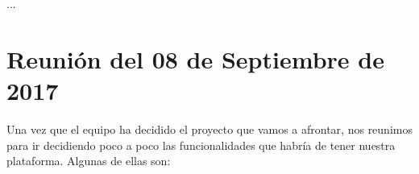 ...


\section{Reunión del 08 de Septiembre de 2017}

Una vez que el equipo ha decidido el proyecto que vamos a afrontar, nos reunimos para ir decidiendo poco a poco las funcionalidades que habría de tener nuestra plataforma. Algunas de ellas son:
